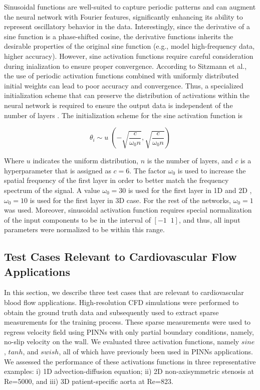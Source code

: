 \documentclass[times,twocolumn,final]{elsarticle}
\begin{document}
{Sinusoidal functions are well-suited to capture periodic patterns and can augment the neural network with Fourier features, significantly enhancing its ability to represent oscillatory behavior in the data. Interestingly, since the derivative of a sine function is a phase-shifted cosine, the derivative functions inherits the desirable properties of the original sine function (e.g., model high-frequency data, higher accuracy). However, sine activation functions require careful consideration during inialization to ensure proper convergence. According to Sitzmann et al., the use of periodic activation functions combined with uniformly distributed initial weights can lead to poor accuracy and convergence. Thus, a specialized initialization scheme that can preserve the distribution of activations within the neural network is required to ensure the output data is independent of the number of layers \citep{Sitzmann2020_PINNs}. The initialization scheme for the sine activation function is \citep{Pan2022_PINNs}

\begin{equation}
\theta_i \sim u\;(-\sqrt{\frac{c}{\omega_0 n}},\sqrt{\frac{c}{\omega_0 n}})
\end{equation}

Where $u$ indicates the uniform distribution, $n$ is the number of layers, and $c$ is  a hyperparameter that is assigned as $c=6$. The factor $\omega_0$ is used to increase the spatial frequency of the first layer in order to better match the frequency spectrum of the signal. A value $\omega_0=30$ is used for the first layer in 1D and 2D , $\omega_0=10$ is used for the first layer in 3D case. For the rest of the networks, $\omega_0=1$ was used. Moreover, sinusoidal activation function requires special normalization of the input components to be in the interval of $[-1 \;\; 1]$, and thus, all input parameters were normalized to be within this range. 

\subsection{Test Cases Relevant to Cardiovascular Flow Applications}
In this section, we describe three test cases that are relevant to cardiovascular blood flow applications. High-resolution CFD simulations were performed to obtain the ground truth data and subsequently used to extract sparse measurements for the training process. These sparse measurements were used to regress velocity field using PINNs with only partial boundary conditions, namely, no-slip velocity on the wall. We evaluated three activation functions, namely $sine$, $tanh$, and $swish$, all of which have previously been used in PINNs applications. We assessed the performance of these activations functions in three representative examples: i) 1D advection-diffusion equation; ii) 2D non-axisymmetric stenosis at Re=5000, and iii) 3D patient-specific aorta at Re=823. 

}
\end{document}
